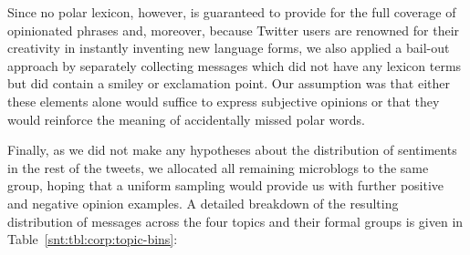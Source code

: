 Since no polar lexicon, however, is guaranteed to provide for the full
coverage of opinionated phrases and, moreover, because Twitter users
are renowned for their creativity in instantly inventing new language
forms, we also applied a bail-out approach by separately collecting
messages which did not have any lexicon terms but did contain a smiley
or exclamation point.  Our assumption was that either these elements
alone would suffice to express subjective opinions or that they would
reinforce the meaning of accidentally missed polar words.

Finally, as we did not make any hypotheses about the distribution of
sentiments in the rest of the tweets, we allocated all remaining
microblogs to the same group, hoping that a uniform sampling would
provide us with further positive and negative opinion examples.  A
detailed breakdown of the resulting distribution of messages across
the four topics and their formal groups is given in
Table~\ref{snt:tbl:corp:topic-bins}:
